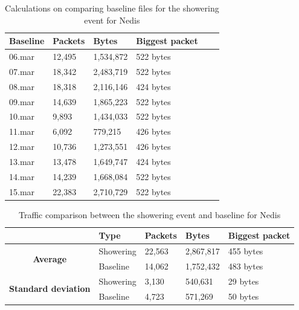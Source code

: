 \begin{table}[H]
    \centering
    \caption{Calculations on comparing baseline files for the showering event for Nedis}
    \begin{tabular}{|l|l|l|l|l|l|}
    \hline
        \textbf{Baseline} & \textbf{Packets} & \textbf{Bytes} & \textbf{Biggest packet} \\ \hline
        06.mar & 12,495 & 1,534,872 & 522 bytes \\ \hline
        07.mar & 18,342 & 2,483,719 & 522 bytes \\ \hline
        08.mar & 18,318 & 2,116,146 & 424 bytes \\ \hline
        09.mar & 14,639 & 1,865,223 & 522 bytes \\ \hline
        10.mar & 9,893  & 1,434,033 & 522 bytes \\ \hline
        11.mar & 6,092  & 779,215   & 426 bytes \\ \hline
        12.mar & 10,736 & 1,273,551 & 426 bytes \\ \hline
        13.mar & 13,478 & 1,649,747 & 424 bytes \\ \hline
        14.mar & 14,239 & 1,668,084 & 522 bytes \\ \hline
        15.mar & 22,383 & 2,710,729 & 522 bytes \\ \hline
    \end{tabular}
    \label{tab:NedisBaselineShowerCalculations}
\end{table}

\begin{table}[H]
    \centering
    \caption{Traffic comparison between the showering event and baseline for Nedis}
    \begin{tabular}{c|l|l|l|l|}
        \cline{2-5}
        \multicolumn{1}{l|}{}                                              & \textbf{Type} & \textbf{Packets} & \textbf{Bytes} & \textbf{Biggest packet} \\ \hline
        \multicolumn{1}{|c|}{\multirow{2}{*}{\textbf{Average}}}            & Showering         & 22,563             & 2,867,817       & 455 bytes               \\ \cline{2-5} 
        \multicolumn{1}{|c|}{}                                             & Baseline      & 14,062             & 1,752,432       & 483 bytes                \\ \hline
        \multicolumn{1}{|c|}{\multirow{2}{*}{\textbf{Standard deviation}}} & Showering         & 3,130              & 540,631         & 29 bytes                 \\ \cline{2-5} 
        \multicolumn{1}{|c|}{}                                             & Baseline      & 4,723              & 571,269         & 50 bytes               \\ \hline          
    \end{tabular}
    \label{tab:NedisComparingBaselineAndShowerCalculations}
\end{table}

